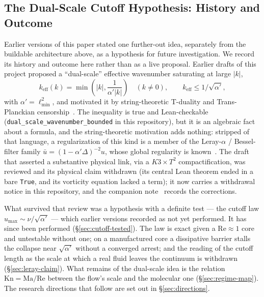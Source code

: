 \documentclass[11pt,a4paper]{article}
\begin{document}
\subsection{The Dual-Scale Cutoff Hypothesis: History and Outcome}

Earlier versions of this paper stated one further-out idea, separately from the buildable
architecture above, as a hypothesis for future investigation. We record its history and outcome here
rather than as a live proposal. Earlier drafts of this project proposed a ``dual-scale'' effective wavenumber saturating at large $|k|$,
\begin{equation}
  k_{\text{eff}}(k) = \min\left(|k|, \dfrac{1}{\alpha' |k|}\right)\quad(k\neq0),\qquad
  k_{\text{eff}}\le 1/\sqrt{\alpha'},
  \label{eq:dual_scale_metric}
\end{equation}
with $\alpha'=\ell_{\min}^2$, and motivated it by string-theoretic T-duality and Trans-Planckian
censorship~\cite{BedroyaVafa2020}. The inequality is true and Lean-checkable
(\texttt{dual\_scale\_wavenumber\_bounded} in this repository), but it is an algebraic fact about
a formula, and the string-theoretic motivation adds nothing: stripped of that language, a
regularization of this kind is a member of the Leray-$\alpha$ / Bessel-filter family
$\bar u=(1-\alpha'\Delta)^{-2}u$, whose global regularity is known~\cite{FHT2001,CHOT2005}. The
draft that asserted a substantive physical link, via a $K3\times T^2$ compactification, was
reviewed and its physical claim withdrawn (its central Lean theorem ended in a bare \texttt{True},
and its vorticity equation lacked a term); it now carries a withdrawal notice in this repository,
and the companion note~\cite{Callens2026v2} records the corrections.

What survived that review was a hypothesis with a definite test --- the cutoff law
$u_{\max}\sim\nu/\sqrt{\alpha'}$ --- which earlier versions recorded as not yet performed. It has
since been performed (\S\ref{sec:cutoff-tested}). The law is exact given a $\mathrm{Re}\approx1$ core
and untestable without one; on a manufactured core a dissipative barrier stalls the collapse near
$\sqrt{\alpha'}$ without a converged arrest; and the reading of the cutoff length as the scale at which
a real fluid leaves the continuum is withdrawn (\S\ref{sec:leray-claim}). What remains of the
dual-scale idea is the relation $\mathrm{Kn}=\mathrm{Ma}/\mathrm{Re}$ between the flow's scale and the
molecular one (\S\ref{sec:regime-map}). The research directions that follow are set out in
\S\ref{sec:directions}.
\end{document}
